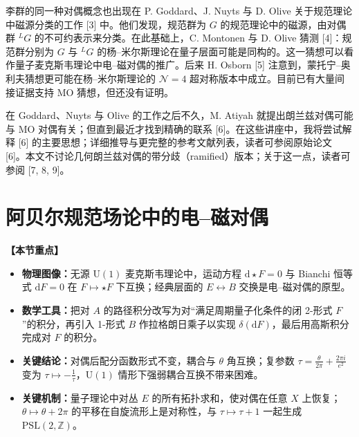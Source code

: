 \documentclass[11pt,a4paper,UTF8]{ctexart}
\newenvironment{keypoints}{%
  \par\addvspace{0.9em}%
  \noindent{\color{black!80}\rule{\linewidth}{0.6pt}}\par\nopagebreak\vspace{2pt}%
  \noindent\textbf{【本节重点】}\par\nopagebreak\vspace{2pt}%
  \begin{itemize}[leftmargin=1.6em,itemsep=1pt,topsep=2pt,parsep=0pt]%
}{%
  \end{itemize}\vspace{1pt}\noindent{\color{black!80}\rule{\linewidth}{0.6pt}}\par\addvspace{0.9em}%
}
\begin{document}
李群的同一种对偶概念也出现在 P. Goddard、J. Nuyts 与 D. Olive 关于规范理论中磁源分类的工作 [3] 中。他们发现，规范群为 $G$ 的规范理论中的磁源，由对偶群 ${}^{L}G$ 的不可约表示来分类。在此基础上，C. Montonen 与 D. Olive 猜测 [4]：规范群分别为 $G$ 与 ${}^{L}G$ 的杨–米尔斯理论在量子层面可能是同构的。这一猜想可以看作量子麦克斯韦理论中电–磁对偶的推广。后来 H. Osborn [5] 注意到，蒙托宁–奥利夫猜想更可能在杨–米尔斯理论的 $\mathcal{N}=4$ 超对称版本中成立。目前已有大量间接证据支持 MO 猜想，但还没有证明。


在 Goddard、Nuyts 与 Olive 的工作之后不久，M. Atiyah 就提出朗兰兹对偶可能与 MO 对偶有关；但直到最近才找到精确的联系 [6]。在这些讲座中，我将尝试解释 [6] 的主要思想；详细推导与更完整的参考文献列表，读者可参阅原始论文 [6]。本文不讨论几何朗兰兹对偶的带分歧（ramified）版本；关于这一点，读者可参阅 [7, 8, 9]。


\section{阿贝尔规范场论中的电–磁对偶}

\begin{keypoints}
    \item \textbf{物理图像：}无源 $\mathrm{U}(1)$ 麦克斯韦理论中，运动方程 $\mathrm{d}\star F=0$ 与 Bianchi 恒等式 $\mathrm{d}F=0$ 在 $F\mapsto\star F$ 下互换；经典层面的 $E\leftrightarrow B$ 交换是电–磁对偶的原型。
    \item \textbf{数学工具：}把对 $A$ 的路径积分改写为对“满足周期量子化条件的闭 2-形式 $F$”的积分，再引入 1-形式 $B$ 作拉格朗日乘子以实现 $\delta(\mathrm{d}F)$，最后用高斯积分完成对 $F$ 的积分。
    \item \textbf{关键结论：}对偶后配分函数形式不变，耦合与 $\theta$ 角互换；复参数 $\tau=\frac{\theta}{2\pi}+\frac{2\pi i}{e^{2}}$ 变为 $\tau\mapsto-\frac{1}{\tau}$，$\mathrm{U}(1)$ 情形下强弱耦合互换不带来困难。
    \item \textbf{关键机制：}量子理论中对丛 $E$ 的所有拓扑求和，使对偶在任意 $X$ 上恢复；$\theta\mapsto\theta+2\pi$ 的平移在自旋流形上是对称性，与 $\tau\mapsto\tau+1$ 一起生成 $\mathrm{PSL}(2,\mathbb{Z})$。
\end{keypoints}
\end{document}
